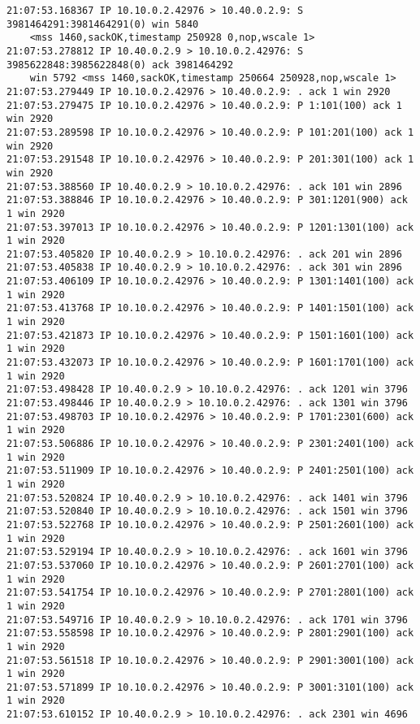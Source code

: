 \documentclass[a4paper,12pt]{article}
\begin{document}
\begin{Verbatim}
21:07:53.168367 IP 10.10.0.2.42976 > 10.40.0.2.9: S 3981464291:3981464291(0) win 5840 
	<mss 1460,sackOK,timestamp 250928 0,nop,wscale 1>
21:07:53.278812 IP 10.40.0.2.9 > 10.10.0.2.42976: S 3985622848:3985622848(0) ack 3981464292 
	win 5792 <mss 1460,sackOK,timestamp 250664 250928,nop,wscale 1>
21:07:53.279449 IP 10.10.0.2.42976 > 10.40.0.2.9: . ack 1 win 2920 
21:07:53.279475 IP 10.10.0.2.42976 > 10.40.0.2.9: P 1:101(100) ack 1 win 2920 
21:07:53.289598 IP 10.10.0.2.42976 > 10.40.0.2.9: P 101:201(100) ack 1 win 2920 
21:07:53.291548 IP 10.10.0.2.42976 > 10.40.0.2.9: P 201:301(100) ack 1 win 2920 
21:07:53.388560 IP 10.40.0.2.9 > 10.10.0.2.42976: . ack 101 win 2896 
21:07:53.388846 IP 10.10.0.2.42976 > 10.40.0.2.9: P 301:1201(900) ack 1 win 2920 
21:07:53.397013 IP 10.10.0.2.42976 > 10.40.0.2.9: P 1201:1301(100) ack 1 win 2920 
21:07:53.405820 IP 10.40.0.2.9 > 10.10.0.2.42976: . ack 201 win 2896 
21:07:53.405838 IP 10.40.0.2.9 > 10.10.0.2.42976: . ack 301 win 2896 
21:07:53.406109 IP 10.10.0.2.42976 > 10.40.0.2.9: P 1301:1401(100) ack 1 win 2920 
21:07:53.413768 IP 10.10.0.2.42976 > 10.40.0.2.9: P 1401:1501(100) ack 1 win 2920 
21:07:53.421873 IP 10.10.0.2.42976 > 10.40.0.2.9: P 1501:1601(100) ack 1 win 2920 
21:07:53.432073 IP 10.10.0.2.42976 > 10.40.0.2.9: P 1601:1701(100) ack 1 win 2920 
21:07:53.498428 IP 10.40.0.2.9 > 10.10.0.2.42976: . ack 1201 win 3796 
21:07:53.498446 IP 10.40.0.2.9 > 10.10.0.2.42976: . ack 1301 win 3796 
21:07:53.498703 IP 10.10.0.2.42976 > 10.40.0.2.9: P 1701:2301(600) ack 1 win 2920 
21:07:53.506886 IP 10.10.0.2.42976 > 10.40.0.2.9: P 2301:2401(100) ack 1 win 2920 
21:07:53.511909 IP 10.10.0.2.42976 > 10.40.0.2.9: P 2401:2501(100) ack 1 win 2920 
21:07:53.520824 IP 10.40.0.2.9 > 10.10.0.2.42976: . ack 1401 win 3796 
21:07:53.520840 IP 10.40.0.2.9 > 10.10.0.2.42976: . ack 1501 win 3796 
21:07:53.522768 IP 10.10.0.2.42976 > 10.40.0.2.9: P 2501:2601(100) ack 1 win 2920 
21:07:53.529194 IP 10.40.0.2.9 > 10.10.0.2.42976: . ack 1601 win 3796 
21:07:53.537060 IP 10.10.0.2.42976 > 10.40.0.2.9: P 2601:2701(100) ack 1 win 2920 
21:07:53.541754 IP 10.10.0.2.42976 > 10.40.0.2.9: P 2701:2801(100) ack 1 win 2920 
21:07:53.549716 IP 10.40.0.2.9 > 10.10.0.2.42976: . ack 1701 win 3796 
21:07:53.558598 IP 10.10.0.2.42976 > 10.40.0.2.9: P 2801:2901(100) ack 1 win 2920 
21:07:53.561518 IP 10.10.0.2.42976 > 10.40.0.2.9: P 2901:3001(100) ack 1 win 2920 
21:07:53.571899 IP 10.10.0.2.42976 > 10.40.0.2.9: P 3001:3101(100) ack 1 win 2920 
21:07:53.610152 IP 10.40.0.2.9 > 10.10.0.2.42976: . ack 2301 win 4696 

\end{Verbatim}
\end{document}
